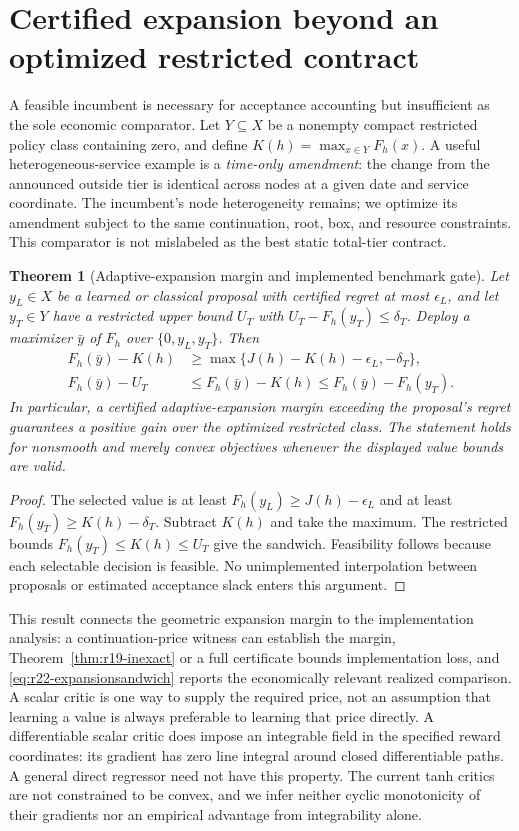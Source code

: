 \documentclass[11pt,letterpaper]{article}
\newtheorem{theorem}{Theorem}[section]
\theoremstyle{definition}
\newcommand{\1}{\mathbf 1}
\begin{document}
\section{Certified expansion beyond an optimized restricted contract}\label{sec:r22-benchmark}
A feasible incumbent is necessary for acceptance accounting but insufficient as the sole economic comparator. Let $Y\subseteq X$ be a nonempty compact restricted policy class containing zero, and define $K(h)=\max_{x\in Y}F_h(x)$. A useful heterogeneous-service example is a \emph{time-only amendment}: the change from the announced outside tier is identical across nodes at a given date and service coordinate. The incumbent's node heterogeneity remains; we optimize its amendment subject to the same continuation, root, box, and resource constraints. This comparator is not mislabeled as the best static total-tier contract.

\begin{theorem}[Adaptive-expansion margin and implemented benchmark gate]\label{thm:r22-expansion}
Let $y_L\in X$ be a learned or classical proposal with certified regret at most $\epsilon_L$, and let $y_T\in Y$ have a restricted upper bound $U_T$ with $U_T-F_h(y_T)\leq\delta_T$. Deploy a maximizer $\bar y$ of $F_h$ over $\{0,y_L,y_T\}$. Then
\begin{align}
 F_h(\bar y)-K(h)&\geq\max\{J(h)-K(h)-\epsilon_L,-\delta_T\},\label{eq:r22-expansion}\\
 F_h(\bar y)-U_T&\leq F_h(\bar y)-K(h)
 \leq F_h(\bar y)-F_h(y_T).\label{eq:r22-expansionsandwich}
\end{align}
In particular, a certified adaptive-expansion margin exceeding the proposal's regret guarantees a positive gain over the optimized restricted class. The statement holds for nonsmooth and merely convex objectives whenever the displayed value bounds are valid.
\end{theorem}
\begin{proof}
The selected value is at least $F_h(y_L)\geq J(h)-\epsilon_L$ and at least $F_h(y_T)\geq K(h)-\delta_T$. Subtract $K(h)$ and take the maximum. The restricted bounds $F_h(y_T)\leq K(h)\leq U_T$ give the sandwich. Feasibility follows because each selectable decision is feasible. No unimplemented interpolation between proposals or estimated acceptance slack enters this argument.
\end{proof}
This result connects the geometric expansion margin to the implementation analysis: a continuation-price witness can establish the margin, Theorem~\ref{thm:r19-inexact} or a full certificate bounds implementation loss, and \eqref{eq:r22-expansionsandwich} reports the economically relevant realized comparison. A scalar critic is one way to supply the required price, not an assumption that learning a value is always preferable to learning that price directly. A differentiable scalar critic does impose an integrable field in the specified reward coordinates: its gradient has zero line integral around closed differentiable paths. A general direct regressor need not have this property. The current tanh critics are not constrained to be convex, and we infer neither cyclic monotonicity of their gradients nor an empirical advantage from integrability alone.
\end{document}
